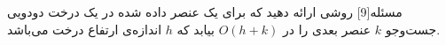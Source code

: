 
‌مسئله[9]
روشی ارائه دهید که برای یک عنصر داده شده در یک درخت دودویی جست‌وجو
$k$
عنصر بعدی را در
$O(h+k)$
بیابد که 
$h$
اندازه‌ی ارتفاع درخت می‌باشد.













